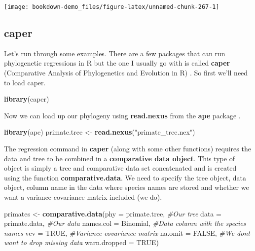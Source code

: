 \documentclass[
]{book}
\newenvironment{Shaded}{\begin{snugshade}}{\end{snugshade}}
\newcommand{\CommentTok}[1]{\textcolor[rgb]{0.56,0.35,0.01}{\textit{#1}}}
\newcommand{\DataTypeTok}[1]{\textcolor[rgb]{0.13,0.29,0.53}{#1}}
\newcommand{\KeywordTok}[1]{\textcolor[rgb]{0.13,0.29,0.53}{\textbf{#1}}}
\newcommand{\NormalTok}[1]{#1}
\newcommand{\OtherTok}[1]{\textcolor[rgb]{0.56,0.35,0.01}{#1}}
\newcommand{\StringTok}[1]{\textcolor[rgb]{0.31,0.60,0.02}{#1}}
\begin{document}
\begin{center}\texttt{[image: bookdown-demo\_files/figure-latex/unnamed-chunk-267-1]} \end{center}

\hypertarget{caper}{%
\subsection{caper}\label{caper}}

Let's run through some examples. There are a few packages that can run phylogenetic regressions in R but the one I usually go with is called \textbf{caper} (Comparative Analysis of Phylogenetics and Evolution in R) \citep{caper}. So first we'll need to load caper.

\begin{Shaded}
\begin{Highlighting}[]
\KeywordTok{library}\NormalTok{(caper)}
\end{Highlighting}
\end{Shaded}

Now we can load up our phylogeny using \textbf{read.nexus} from the \textbf{ape} package \citep{ape}.

\begin{Shaded}
\begin{Highlighting}[]
\KeywordTok{library}\NormalTok{(ape)}
\NormalTok{primate.tree \textless{}{-}}\StringTok{ }\KeywordTok{read.nexus}\NormalTok{(}\StringTok{"primate\_tree.nex"}\NormalTok{)}
\end{Highlighting}
\end{Shaded}

The regression command in \textbf{caper} (along with some other functions) requires the data and tree to be combined in a \textbf{comparative data object}. This type of object is simply a tree and comparative data set concatenated and is created using the function \textbf{comparative.data}. We need to specify the tree object, data object, column name in the data where species names are stored and whether we want a variance-covariance matrix included (we do).

\begin{Shaded}
\begin{Highlighting}[]
\NormalTok{primates \textless{}{-}}\StringTok{ }\KeywordTok{comparative.data}\NormalTok{(}\DataTypeTok{phy =}\NormalTok{ primate.tree,     }\CommentTok{\#Our tree}
                             \DataTypeTok{data =}\NormalTok{ primate.data,    }\CommentTok{\#Our data}
                             \DataTypeTok{names.col =}\NormalTok{ Binomial,   }\CommentTok{\#Data column with the species names}
                             \DataTypeTok{vcv =} \OtherTok{TRUE}\NormalTok{,             }\CommentTok{\#Variance{-}covariance matrix}
                             \DataTypeTok{na.omit =} \OtherTok{FALSE}\NormalTok{,        }\CommentTok{\#We don\textquotesingle{}t want to drop missing data}
                             \DataTypeTok{warn.dropped =} \OtherTok{TRUE}\NormalTok{)}
\end{Highlighting}
\end{Shaded}
\end{document}
